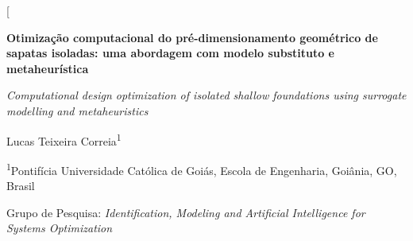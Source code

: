 \documentclass[10pt,a4paper,twocolumn]{article}
\begin{document}
\twocolumn[{
\begin{@twocolumnfalse}
\begin{center}
    {\LARGE \bfseries Otimização computacional do pré-dimensionamento geométrico de sapatas isoladas: uma abordagem com modelo substituto e metaheurística \par}

    \vspace{0.4cm}
    {\large \textit{Computational design optimization of isolated shallow foundations using surrogate modelling and metaheuristics}\par}

    \vspace{0.5cm}
    {\normalsize Lucas Teixeira Correia\textsuperscript{1}\par}
    {\small \textsuperscript{1}Pontifícia Universidade Católica de Goiás, Escola de Engenharia, Goiânia, GO, Brasil\par}
    {\small Grupo de Pesquisa: \textit{Identification, Modeling and Artificial Intelligence for Systems Optimization}\par}
\end{center}

\vspace{0.3cm}


\end{@twocolumnfalse}}
\end{document}
